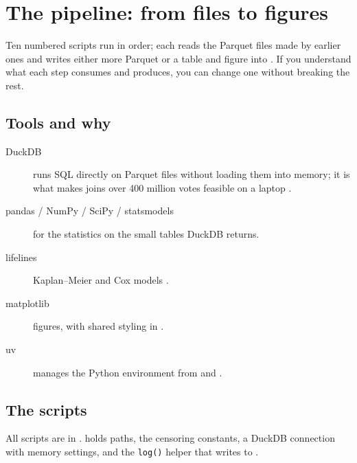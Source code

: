 \chapter{The pipeline: from files to figures}\label{ch:pipeline}

\begin{idea}
Ten numbered scripts run in order; each reads the Parquet files made by earlier ones and writes either more Parquet or a table and figure into . If you understand what each step consumes and produces, you can change one without breaking the rest.
\end{idea}

\section{Tools and why}
\begin{description}
  \item[DuckDB] runs SQL directly on Parquet files without loading them into memory; it is what makes joins over 400 million votes feasible on a laptop .
  \item[pandas / NumPy / SciPy / statsmodels] for the statistics on the small tables DuckDB returns.
  \item[lifelines] Kaplan--Meier and Cox models .
  \item[matplotlib] figures, with shared styling in .
  \item[uv] manages the Python environment from  and .
\end{description}

\section{The scripts}
All scripts are in .  holds paths, the censoring constants, a DuckDB connection with memory settings, and the \texttt{log()} helper that writes to .

